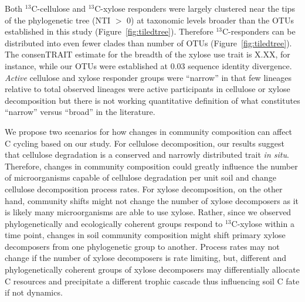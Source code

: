 Both $^{13}$C-cellulose and $^{13}$C-xylose responders were largely clustered
near the tips of the phylogenetic tree (NTI $>$ 0) at taxonomic levels broader
than the OTUs established in this study (Figure~\ref{fig:tiledtree}). Therefore
$^{13}$C-responders can be distributed into even fewer clades than number of
OTUs (Figure~\ref{fig:tiledtree}). The consenTRAIT estimate for the breadth of
the xylose use trait is X.XX, for instance, while our OTUs were established at
0.03 sequence identity divergence. \textit{Active} cellulose and xylose
responder groups were ``narrow'' in that few lineages relative to total
observed lineages were active participants in cellulose or xylose
decomposition but there is not working quantitative definition of what
constitutes ``narrow'' versus ``broad'' in the literature. 

We propose two scenarios for how changes in community composition can affect
C cycling based on our study. For cellulose decomposition, our results suggest
that cellulose degradation is a conserved and narrowly distributed trait
\textit{in situ}. Therefore, changes in community composition could greatly
influence the number of microorganisms capable of cellulose degradation per
unit soil and change cellulose decomposition process rates. For xylose
decomposition, on the other hand, community shifts might not change the number
of xylose decomposers as it is likely many microorganisms are able to use
xylose. Rather, since we observed phylogenetically and ecologically coherent
groups respond to $^{13}$C-xylose within a time point, changes in soil
community composition might shift primary xylose decomposers from one
phylogenetic group to another. Process rates may not change if the number of
xylose decomposers is rate limiting, but, different and phylogenetically
coherent groups of xylose decomposers may differentially allocate C resources
and precipitate a different trophic cascade thus influencing soil C fate if not
dynamics. 

